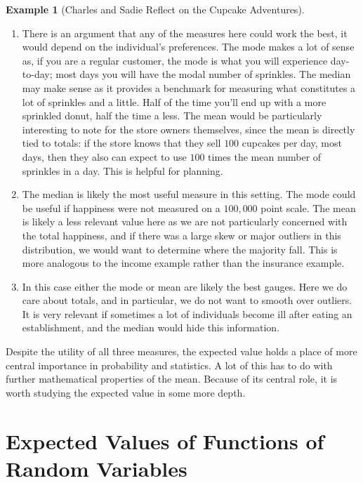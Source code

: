 \documentclass[
  letterpaper,
  DIV=11,
  numbers=noendperiod]{scrreprt}
\theoremstyle{definition}
\theoremstyle{definition}
\newtheorem{example}{Example}[chapter]
\theoremstyle{definition}
\theoremstyle{remark}
\begin{document}
\begin{example}[Charles and Sadie Reflect on the Cupcake
Adventures]
\begin{tcolorbox}[enhanced jigsaw, colback=white, colframe=quarto-callout-color-frame, arc=.35mm, leftrule=.75mm, rightrule=.15mm, opacityback=0, breakable, bottomrule=.15mm, left=2mm, toprule=.15mm]
\begin{enumerate}
\def\labelenumi{\alph{enumi}.}
\item
  There is an argument that any of the measures here could work the
  best, it would depend on the individual's preferences. The mode makes
  a lot of sense as, if you are a regular customer, the mode is what you
  will experience day-to-day; most days you will have the modal number
  of sprinkles. The median may make sense as it provides a benchmark for
  measuring what constitutes a lot of sprinkles and a little. Half of
  the time you'll end up with a more sprinkled donut, half the time a
  less. The mean would be particularly interesting to note for the store
  owners themselves, since the mean is directly tied to totals: if the
  store knows that they sell \(100\) cupcakes per day, most days, then
  they also can expect to use \(100\) times the mean number of sprinkles
  in a day. This is helpful for planning.
\item
  The median is likely the most useful measure in this setting. The mode
  could be useful if happiness were not measured on a \(100,000\) point
  scale. The mean is likely a less relevant value here as we are not
  particularly concerned with the total happiness, and if there was a
  large skew or major outliers in this distribution, we would want to
  determine where the majority fall. This is more analogous to the
  income example rather than the insurance example.
\item
  In this case either the mode or mean are likely the best gauges. Here
  we do care about totals, and in particular, we do not want to smooth
  over outliers. It is very relevant if sometimes a lot of individuals
  become ill after eating an establishment, and the median would hide
  this information.
\end{enumerate}

\end{tcolorbox}

\end{example}

Despite the utility of all three measures, the expected value holds a
place of more central importance in probability and statistics. A lot of
this has to do with further mathematical properties of the mean. Because
of its central role, it is worth studying the expected value in some
more depth.

\section{Expected Values of Functions of Random
Variables}\label{expected-values-of-functions-of-random-variables}
\end{document}
